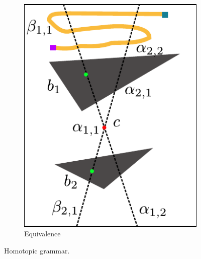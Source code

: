 \documentclass[letterpaper, 10 pt, conference]{ieeeconf}
\begin{document}
\begin{figure}
\begin{subfigure}[t]{0.4\linewidth}
		\includegraphics[width=\textwidth]{fig/repeated_pattern}
		\caption{Equivalence}
		\label{fig:grammar:repeated_pattern}
	\end{subfigure} 
	\caption{Homotopic grammar.}
	\label{fig:grammar}
\end{figure}
\end{document}
